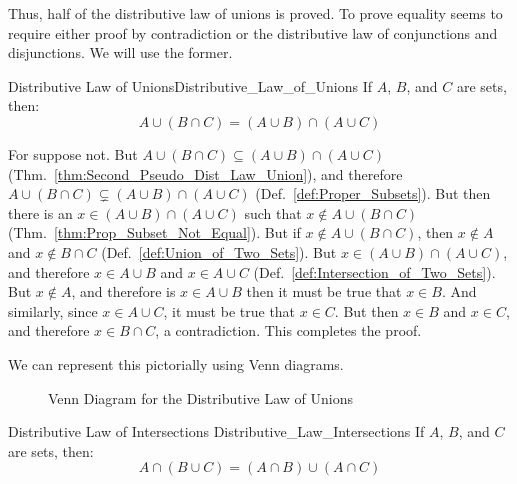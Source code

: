         Thus, half of the distributive law of unions is proved. To prove
        equality seems to require either proof by contradiction or the
        distributive law of conjunctions and disjunctions. We will use the
        former.
        \begin{ftheorem}{Distributive Law of Unions}{Distributive_Law_of_Unions}
            If $A$, $B$, and $C$ are sets, then:
            \begin{equation*}
                A\cup(B\cap{C})=(A\cup{B})\cap(A\cup{C})
            \end{equation*}
        \end{ftheorem}
        \begin{bproof}
            For suppose not. But
            $A\cup(B\cap{C})\subseteq(A\cup{B})\cap(A\cup{C})$
            (Thm.~\ref{thm:Second_Pseudo_Dist_Law_Union}), and therefore
            $A\cup(B\cap{C})\subsetneq(A\cup{B})\cap(A\cup{C})$
            (Def.~\ref{def:Proper_Subsets}). But then there is an
            $x\in(A\cup{B})\cap(A\cup{C})$ such that $x\notin{A}\cup(B\cap{C})$
            (Thm.~\ref{thm:Prop_Subset_Not_Equal}). But if
            $x\notin{A}\cup(B\cap{C})$, then $x\notin{A}$ and
            $x\notin{B}\cap{C}$ (Def.~\ref{def:Union_of_Two_Sets}). But
            $x\in(A\cup{B})\cap(A\cup{C})$, and therefore $x\in{A}\cup{B}$ and
            $x\in{A}\cup{C}$ (Def.~\ref{def:Intersection_of_Two_Sets}). But
            $x\notin{A}$, and therefore is $x\in{A}\cup{B}$ then it must be true
            that $x\in{B}$. And similarly, since $x\in{A}\cup{C}$, it must be
            true that $x\in{C}$. But then $x\in{B}$ and $x\in{C}$, and therefore
            $x\in{B}\cap{C}$, a contradiction. This completes the proof.
        \end{bproof}
        We can represent this pictorially using Venn diagrams.
        \begin{figure}[H]
            \centering
            \captionsetup{type=figure}
            
            \caption{Venn Diagram for the Distributive Law of Unions}
            \label{fig:Venn_Diagram_Distributive_Law_of_Union}
        \end{figure}
        \begin{ftheorem}{Distributive Law of Intersections}
            {Distributive_Law_Intersections}
            If $A$, $B$, and $C$ are sets, then:
            \begin{equation*}
                A\cap(B\cup{C})=(A\cap{B})\cup(A\cap{C})
            \end{equation*}
        \end{ftheorem}

